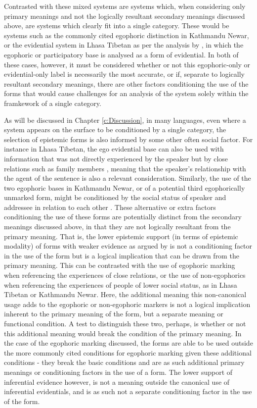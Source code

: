Contrasted with these mixed systems are systems which, when considering only primary meanings and not the logically resultant secondary meanings discussed above, are systems which clearly fit into a single category. These would be systems such as the commonly cited egophoric distinction in Kathmandu Newar, or the evidential system in Lhasa Tibetan as per the analysis by , in which the egophoric or participatory base is analysed as a form of evidential. In both of these cases, however, it must be considered whether or not this egophoric-only or evidential-only label is necessarily the most accurate, or if, separate to logically resultant secondary meanings, there are other factors conditioning the use of the forms that would cause challenges for an analysis of the system solely within the framkework of a single category. 

As will be discussed in Chapter \ref{c:Discussion}, in many languages, even where a system appears on the surface to be conditioned by a single category, the selection of epistemic forms is also informed by some other often social factor. For instance in Lhasa Tibetan, the ego evidential base can also be used with information that was not directly experienced by the speaker but by close relations such as family members \cite{Tournadre2008}, meaning that the speaker's relationship with the agent of the sentence is also a relevant consideration. Similarly, the use of the two egophoric bases in Kathmandu Newar, or of a potential third egophorically unmarked form, might be conditioned by the social status of speaker and addressee in relation to each other \cite{SinghShrestha2023}. These alternative or extra factors conditioning the use of these forms are potentially distinct from the secondary meanings discussed above, in that they are not logically resultant from the primary meaning. That is, the lower epistemic support (in terms of epistemic modality) of forms with weaker evidence as argued by  is not a conditioning factor in the use of the form but is a logical implication that can be drawn from the primary meaning. This can be contrasted with the use of egophoric marking when referencing the experiences of close relations, or the use of non-egophorics when referencing the experiences of people of lower social status, as in Lhasa Tibetan or Kathmandu Newar. Here, the additional meaning this non-canonical usage adds to the egophoric or non-egophoric markers is not a logical implication inherent to the primary meaning of the form, but a separate meaning or functional condition. A test to distinguish these two, perhaps, is whether or not this additional meaning would break the condition of the primary meaning. In the case of the egophoric marking discussed, the forms are able to be used outside the more commonly cited conditions for egophoric marking given these additional conditions - they break the basic conditions and are as such additional primary meanings or conditioning factors in the use of a form. The lower support of inferential evidence however, is not a meaning outside the canonical use of inferential evidentials, and is as such not a separate conditioning factor in the use of the form.

